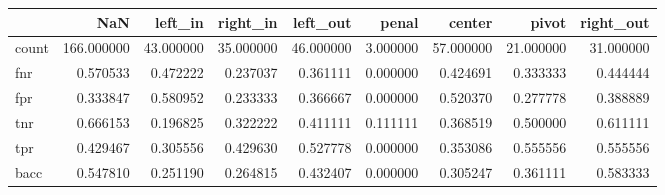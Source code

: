 \begin{tabular}{lrrrrrrrr}
\toprule
{} &         NaN &    left\_in &   right\_in &   left\_out &     penal &     center &      pivot &  right\_out \\
\midrule
count &  166.000000 &  43.000000 &  35.000000 &  46.000000 &  3.000000 &  57.000000 &  21.000000 &  31.000000 \\
fnr   &    0.570533 &   0.472222 &   0.237037 &   0.361111 &  0.000000 &   0.424691 &   0.333333 &   0.444444 \\
fpr   &    0.333847 &   0.580952 &   0.233333 &   0.366667 &  0.000000 &   0.520370 &   0.277778 &   0.388889 \\
tnr   &    0.666153 &   0.196825 &   0.322222 &   0.411111 &  0.111111 &   0.368519 &   0.500000 &   0.611111 \\
tpr   &    0.429467 &   0.305556 &   0.429630 &   0.527778 &  0.000000 &   0.353086 &   0.555556 &   0.555556 \\
bacc  &    0.547810 &   0.251190 &   0.264815 &   0.432407 &  0.000000 &   0.305247 &   0.361111 &   0.583333 \\
\bottomrule
\end{tabular}
